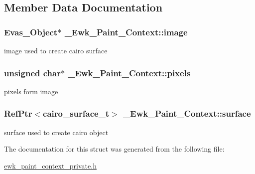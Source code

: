 \subsection{Member Data Documentation}
\hypertarget{struct__Ewk__Paint__Context_a7f357a577ca369bcb271e654cb59e62b}{
\subsubsection[{image}]{\setlength{\rightskip}{0pt plus 5cm}Evas\+\_\+\+Object$\ast$ \+\_\+\+Ewk\+\_\+\+Paint\+\_\+\+Context\+::image}}\label{struct__Ewk__Paint__Context_a7f357a577ca369bcb271e654cb59e62b}
image used to create cairo surface \hypertarget{struct__Ewk__Paint__Context_aa7428ea356e9948321c1d1aad7fec59b}{
\subsubsection[{pixels}]{\setlength{\rightskip}{0pt plus 5cm}unsigned char$\ast$ \+\_\+\+Ewk\+\_\+\+Paint\+\_\+\+Context\+::pixels}}\label{struct__Ewk__Paint__Context_aa7428ea356e9948321c1d1aad7fec59b}
pixels form image \hypertarget{struct__Ewk__Paint__Context_a1bbb71864c0024919197996ff659083d}{
\subsubsection[{surface}]{\setlength{\rightskip}{0pt plus 5cm}Ref\+Ptr$<$cairo\+\_\+surface\+\_\+t$>$ \+\_\+\+Ewk\+\_\+\+Paint\+\_\+\+Context\+::surface}}\label{struct__Ewk__Paint__Context_a1bbb71864c0024919197996ff659083d}
surface used to create cairo object 

The documentation for this struct was generated from the following file\+:\begin{DoxyCompactItemize}
\item 
\hyperlink{ewk__paint__context__private_8h}{ewk\+\_\+paint\+\_\+context\+\_\+private.\+h}\end{DoxyCompactItemize}
